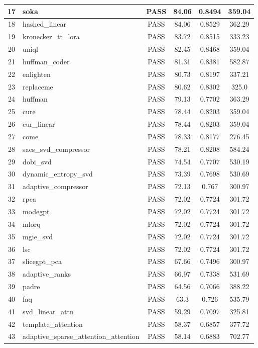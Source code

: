 \documentclass[12pt,a4paper]{report}
\theoremstyle{definition}
\begin{document}
\begin{latin}
\begin{longtable}{@{}|c|l|c|c|c|c|@{}}
\hline
17 & soka & PASS & 84.06 & 0.8494 & 359.04 \\
\hline
18 & hashed\_linear & PASS & 84.06 & 0.8529 & 362.29 \\
\hline
19 & kronecker\_tt\_lora & PASS & 83.72 & 0.8515 & 333.23 \\
\hline
20 & uniql & PASS & 82.45 & 0.8468 & 359.04 \\
\hline
21 & huffman\_coder & PASS & 81.31 & 0.8381 & 582.87 \\
\hline
22 & enlighten & PASS & 80.73 & 0.8197 & 337.21 \\
\hline
23 & replaceme & PASS & 80.62 & 0.8302 & 325.0 \\
\hline
24 & huffman & PASS & 79.13 & 0.7702 & 363.29 \\
\hline
25 & cure & PASS & 78.44 & 0.8203 & 359.04 \\
\hline
26 & cur\_linear & PASS & 78.44 & 0.8203 & 359.04 \\
\hline
27 & come & PASS & 78.33 & 0.8177 & 276.45 \\
\hline
28 & saes\_svd\_compressor & PASS & 78.21 & 0.8208 & 584.24 \\
\hline
29 & dobi\_svd & PASS & 74.54 & 0.7707 & 530.19 \\
\hline
30 & dynamic\_entropy\_svd & PASS & 73.39 & 0.7698 & 530.69 \\
\hline
31 & adaptive\_compressor & PASS & 72.13 & 0.767 & 300.97 \\
\hline
32 & rpca & PASS & 72.02 & 0.7724 & 301.72 \\
\hline
33 & modegpt & PASS & 72.02 & 0.7724 & 301.72 \\
\hline
34 & mlorq & PASS & 72.02 & 0.7724 & 301.72 \\
\hline
35 & mgie\_svd & PASS & 72.02 & 0.7724 & 301.72 \\
\hline
36 & lsc & PASS & 72.02 & 0.7724 & 301.72 \\
\hline
37 & slicegpt\_pca & PASS & 67.66 & 0.7496 & 300.97 \\
\hline
38 & adaptive\_ranks & PASS & 66.97 & 0.7338 & 531.69 \\
\hline
39 & padre & PASS & 64.56 & 0.7066 & 388.22 \\
\hline
40 & faq & PASS & 63.3 & 0.726 & 535.79 \\
\hline
41 & svd\_linear\_attn & PASS & 59.29 & 0.7097 & 325.81 \\
\hline
42 & template\_attention & PASS & 58.37 & 0.6857 & 377.72 \\
\hline
43 & adaptive\_sparse\_attention\_attention & PASS & 58.14 & 0.6883 & 702.77 \\

\end{longtable}
\end{latin}
\end{document}
